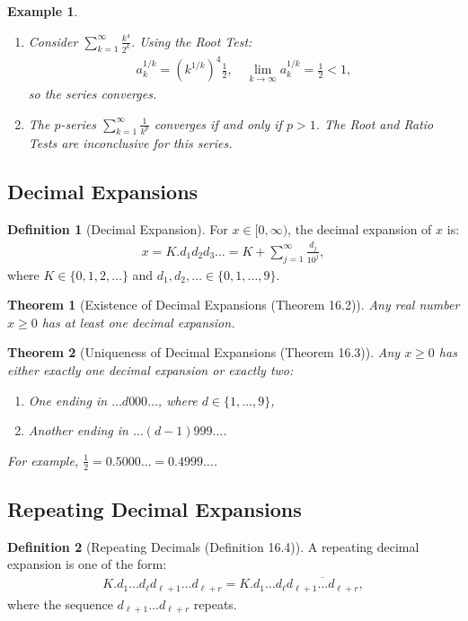 \documentclass[9pt]{article}
\theoremstyle{definition}
\newtheorem{definition}{Definition}
\theoremstyle{plain}
\newtheorem{theorem}{Theorem}
\newtheorem{example}{Example}
\begin{document}
\begin{example}

\begin{enumerate}
    \item Consider $ \sum_{k=1}^\infty \frac{k^4}{2^k} $. Using the Root Test:
    \begin{align}
    a_k^{1/k} = \left( k^{1/k} \right)^4 \frac{1}{2}, \quad \lim_{k \to \infty} a_k^{1/k} = \frac{1}{2} < 1,
    \end{align}
    so the series converges.
    \item The $ p $-series $ \sum_{k=1}^\infty \frac{1}{k^p} $ converges if and only if $ p > 1 $. The Root and Ratio Tests are inconclusive for this series.
\end{enumerate}
\end{example}

\subsection*{Decimal Expansions}
\begin{definition}[Decimal Expansion]
For $ x \in [0, \infty) $, the decimal expansion of $ x $ is:
\begin{align}
x = K .d_1 d_2 d_3 \ldots = K + \sum_{j=1}^\infty \frac{d_j}{10^j},
\end{align}
where $ K \in \{0, 1, 2, \ldots\} $ and $ d_1, d_2, \ldots \in \{0, 1, \ldots, 9\} $.
\end{definition}

\begin{theorem}[Existence of Decimal Expansions (Theorem 16.2)]
Any real number $ x \geq 0 $ has at least one decimal expansion.
\end{theorem}

\begin{theorem}[Uniqueness of Decimal Expansions (Theorem 16.3)]
Any $ x \geq 0 $ has either exactly one decimal expansion or exactly two:
\begin{enumerate}
    \item One ending in $ \ldots d000 \ldots $, where $ d \in \{1, \ldots, 9\} $,
    \item Another ending in $ \ldots (d-1)999 \ldots $.
\end{enumerate}
For example, $ \frac{1}{2} = 0.5000\ldots = 0.4999\ldots $.
\end{theorem}

\subsection*{Repeating Decimal Expansions}
\begin{definition}[Repeating Decimals (Definition 16.4)]
A repeating decimal expansion is one of the form:
\begin{align}
K .d_1 \ldots d_\ell d_{\ell+1} \ldots d_{\ell+r} = K .d_1 \ldots d_\ell \overline{d_{\ell+1} \ldots d_{\ell+r}},
\end{align}
where the sequence $ d_{\ell+1} \ldots d_{\ell+r} $ repeats.
\end{definition}
\end{document}
